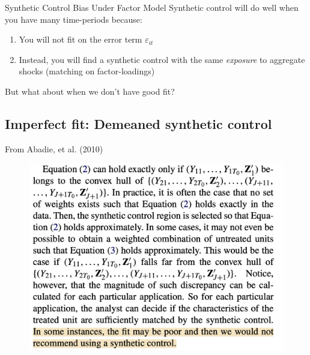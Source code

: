 \documentclass{beamer}
\begin{document}
\begin{frame}{ Synthetic Control Bias Under Factor Model}
  Synthetic control will do well when you have many time-periods because:
  \begin{enumerate}
    \item You will not fit on the error term $\varepsilon_{it}$ 
    \item Instead, you will find a synthetic control with the same \emph{exposure} to aggregate shocks (matching on factor-loadings)
  \end{enumerate}

  \bigskip
  But what about when we don't have good fit?
\end{frame}

\subsection{Imperfect fit: Demeaned synthetic control}

\begin{frame}{From Abadie, et al. (2010)}

	\begin{figure}
	\includegraphics[scale=0.40]{./lecture_includes/abadie_imperfect_fit}
	\end{figure}

\end{frame}
\end{document}
